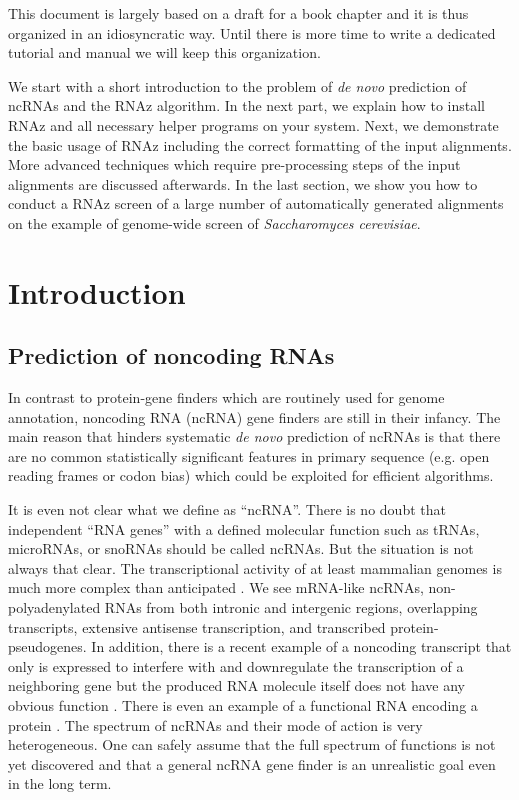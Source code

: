 \documentclass[11pt]{article}
\begin{document}
This document is largely based on a draft for a book chapter and it is thus
organized in an idiosyncratic way. Until there is more time to write a
dedicated tutorial and manual we will keep this organization.

We start with a short introduction to the problem of \emph{de novo}
prediction of ncRNAs and the RNAz algorithm. In the next part, we explain
how to install RNAz and all necessary helper programs on your system. Next,
we demonstrate the basic usage of RNAz including the correct formatting of
the input alignments. More advanced techniques which require pre-processing
steps of the input alignments are discussed afterwards. In the last
section, we show you how to conduct a RNAz screen of a large number of
automatically generated alignments on the example of genome-wide screen of
\emph{Saccharomyces cerevisiae}.


\newpage


\section{Introduction}

\subsection{Prediction of noncoding RNAs}

In contrast to protein-gene finders which are routinely used for genome
annotation, noncoding RNA (ncRNA) gene finders are still in their infancy.
The main reason that hinders systematic \emph{de novo} prediction of ncRNAs
is that there are no common statistically significant features in primary
sequence (e.g. open reading frames or codon bias) which could be exploited
for efficient algorithms.

It is even not clear what we define as ``ncRNA''. There is no doubt that
independent ``RNA genes'' with a defined molecular function such as tRNAs,
microRNAs, or snoRNAs should be called ncRNAs. But the situation is not
always that clear. The transcriptional activity of at least mammalian
genomes is much more complex than anticipated \cite{frith05}. We see
mRNA-like ncRNAs, non-polyadenylated RNAs from both intronic and intergenic
regions, overlapping transcripts, extensive antisense transcription, and
transcribed protein-pseudogenes. In addition, there is a recent example of
a noncoding transcript that only is expressed to interfere with and
downregulate the transcription of a neighboring gene but the produced RNA
molecule itself does not have any obvious function \cite{martens04}. There
is even an example of a functional RNA encoding a protein
\cite{chooniedass-ko04}. The spectrum of ncRNAs and their mode of action is
very heterogeneous. One can safely assume that the full spectrum of
functions is not yet discovered and that a general ncRNA gene finder is an
unrealistic goal even in the long term.
\end{document}
